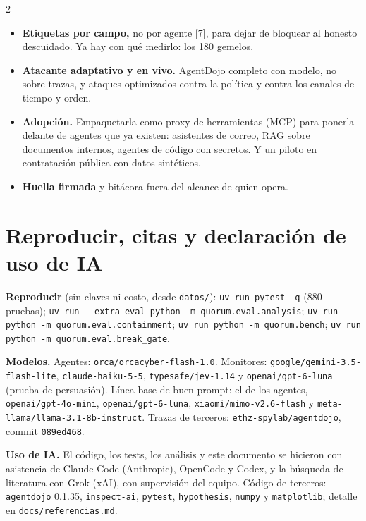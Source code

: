 \documentclass[9pt,letterpaper]{extarticle}
\newcommand{\ntests}{880}
\newcommand{\lead}[1]{\textbf{#1}}
\begin{document}
\begin{multicols*}{2}
\begin{itemize}
  \item \lead{Etiquetas por campo,} no por agente [7], para dejar de bloquear al honesto descuidado. Ya hay con qué medirlo: los 180 gemelos.
  \item \lead{Atacante adaptativo y en vivo.} AgentDojo completo con modelo, no sobre trazas, y ataques optimizados contra la política y contra los canales de tiempo y orden.
  \item \lead{Adopción.} Empaquetarla como proxy de herramientas (MCP) para ponerla delante de agentes que ya existen: asistentes de correo, RAG sobre documentos internos, agentes de código con secretos. Y un piloto en contratación pública con datos sintéticos.
  \item \lead{Huella firmada} y bitácora fuera del alcance de quien opera.
\end{itemize}

\section{Reproducir, citas y declaración de uso de IA}

{\fontsize{6.8}{8}\selectfont\raggedright\setlength{\parskip}{1.5pt}
\lead{Reproducir} (sin claves ni costo, desde \texttt{datos/}): \texttt{uv run pytest -q} (\ntests{} pruebas); \texttt{uv run -{}-extra eval python -m quorum.eval.analysis}; \texttt{uv run python -m quorum.eval.containment}; \texttt{uv run python -m quorum.bench}; \texttt{uv run python -m quorum.eval.break\_gate}.

\lead{Modelos.} Agentes: \texttt{orca/orcacyber-flash-1.0}. Monitores: \texttt{google/gemini-3.5-flash-lite}, \texttt{claude-haiku-5-5}, \texttt{typesafe/jev-1.14} y \texttt{openai/gpt-6-luna} (prueba de persuasión). Línea base de buen prompt: el de los agentes, \texttt{openai/gpt-4o-mini}, \texttt{openai/gpt-6-luna}, \texttt{xiaomi/mimo-v2.6-flash} y \texttt{meta-llama/llama-3.1-8b-instruct}. Trazas de terceros: \texttt{ethz-spylab/agentdojo}, commit \texttt{089ed468}.

\lead{Uso de IA.} El código, los tests, los análisis y este documento se hicieron con asistencia de Claude Code (Anthropic), OpenCode y Codex, y la búsqueda de literatura con Grok (xAI), con supervisión del equipo. Código de terceros: \texttt{agentdojo} 0.1.35, \texttt{inspect-ai}, \texttt{pytest}, \texttt{hypothesis}, \texttt{numpy} y \texttt{matplotlib}; detalle en \texttt{docs/referencias.md}.

}
\end{multicols*}
\end{document}
